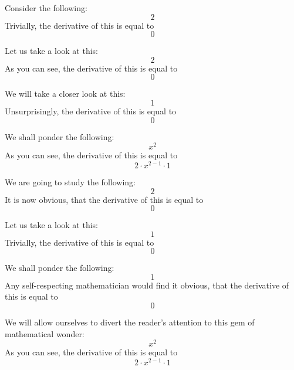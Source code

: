 \documentclass{article}
\begin{document}
Consider the following:
\begin{equation}
2 
\end{equation}
Trivially, the derivative of this is equal to
\begin{equation}
0 
\end{equation}

Let us take a look at this:
\begin{equation}
2 
\end{equation}
As you can see, the derivative of this is equal to
\begin{equation}
0 
\end{equation}

We will take a closer look at this:
\begin{equation}
1 
\end{equation}
Unsurprisingly, the derivative of this is equal to
\begin{equation}
0 
\end{equation}

We shall ponder the following:
\begin{equation}
x ^{2 } 
\end{equation}
As you can see, the derivative of this is equal to
\begin{equation}
2 \cdot x ^{2 - 1 } \cdot 1 
\end{equation}

We are going to study the following:
\begin{equation}
2 
\end{equation}
It is now obvious, that the derivative of this is equal to
\begin{equation}
0 
\end{equation}

Let us take a look at this:
\begin{equation}
1 
\end{equation}
Trivially, the derivative of this is equal to
\begin{equation}
0 
\end{equation}

We shall ponder the following:
\begin{equation}
1 
\end{equation}
Any self-respecting mathematician would find it obvious, that the derivative of this is equal to
\begin{equation}
0 
\end{equation}

We will allow ourselves to divert the reader's attention to this gem of mathematical wonder:
\begin{equation}
x ^{2 } 
\end{equation}
As you can see, the derivative of this is equal to
\begin{equation}
2 \cdot x ^{2 - 1 } \cdot 1 
\end{equation}
\end{document}
